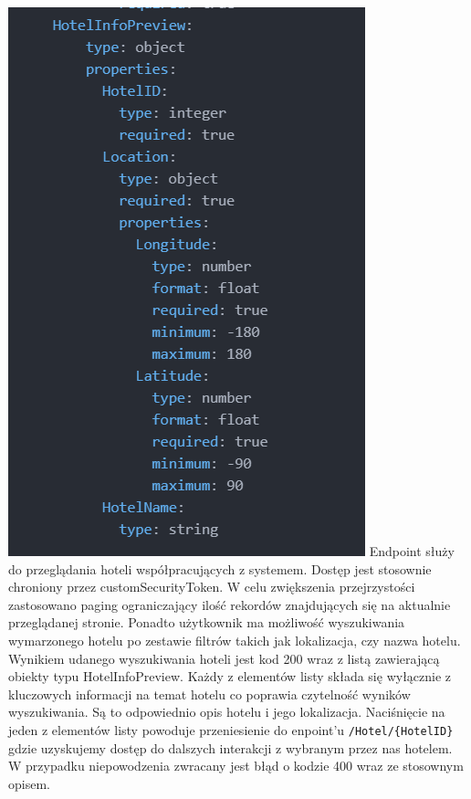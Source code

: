 \documentclass{article}
\begin{document}
\newpage
\includegraphics[width=\linewidth]{Oferta+Hotel-Raml/HotelInfoPreview_Raml.png}
Endpoint służy do przeglądania hoteli współpracujących z systemem. Dostęp jest stosownie chroniony przez customSecurityToken. W celu zwiększenia przejrzystości zastosowano paging ograniczający ilość rekordów znajdujących się na aktualnie przeglądanej stronie. Ponadto użytkownik ma możliwość wyszukiwania wymarzonego hotelu po zestawie filtrów takich jak lokalizacja, czy nazwa hotelu. Wynikiem udanego wyszukiwania hoteli jest kod 200 wraz z listą zawierającą obiekty typu HotelInfoPreview. Każdy z elementów listy składa się wyłącznie z kluczowych informacji na temat hotelu co poprawia czytelność wyników wyszukiwania. Są to odpowiednio opis hotelu i jego lokalizacja. Naciśnięcie na jeden z elementów listy powoduje przeniesienie do enpoint'u \texttt{/Hotel/\{HotelID\}} gdzie uzyskujemy dostęp do dalszych interakcji z wybranym przez nas hotelem.\\
W przypadku niepowodzenia zwracany jest błąd o kodzie 400 wraz ze stosownym opisem.
\end{document}
